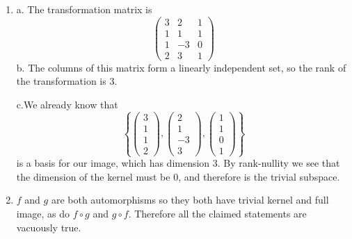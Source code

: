 \documentclass{article}
\newcommand{\chapternumber}{2}
\newenvironment{QandA}{\begin{enumerate}[label=\chapternumber.\arabic*]\bfseries\boldmath}
	{\end{enumerate}}
\newenvironment{answered}{\par\bigskip\normalfont\unboldmath}{}
\begin{document}
\begin{QandA}
\begin{answered}
			c. No - $\cos(0)\neq 0$ so $\forall x, \cos(x+0)\neq \cos(x)+\cos(0)$
			
			d. Yes - matrix multiplication distributes over addition and commutes with scalar multiplication
			
			e. No - $\Phi(x)\neq 0$ (where in this case 0 is notation abuse meaning the 2x2 zero matrix) so we have the same problem as in part c.
		\end{answered}
		
		\item
		\begin{answered}
			a. The transformation matrix is 
			\[
			\begin{pmatrix}
				3 & 2 & 1 \\
				1 & 1 & 1 \\
				1 & -3 & 0 \\
				2 & 3 & 1
			\end{pmatrix}
			\]
			b. The columns of this matrix form a linearly independent set, so the rank of the transformation is 3.
			
			c.We already know that
			\[\left\{\begin{pmatrix}
				3 \\
				1 \\
				1 \\
				2
			\end{pmatrix},
			\begin{pmatrix}
				2 \\
				1 \\
				-3 \\
				3
			\end{pmatrix}
			,
			\begin{pmatrix}
				1 \\
				1 \\
				0 \\
				1
			\end{pmatrix}\right\}\]
			is a basis for our image, which has dimension 3. By rank-nullity we see that the dimension of the kernel must be 0, and therefore is the trivial subspace.
		\end{answered}
		
		\item 
		\begin{answered}
			$f$ and $g$ are both automorphisms so they both have trivial kernel and full image, as do $f\circ g$ and $g\circ f$. Therefore all the claimed statements are vacuously true.
		\end{answered}
		

\end{QandA}
\end{document}
